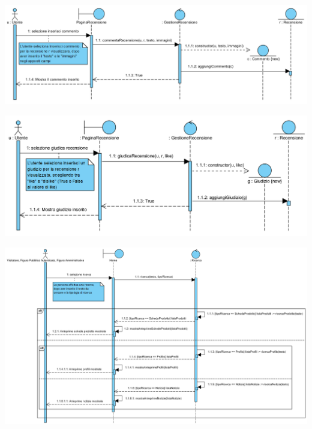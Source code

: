 \begin{landscape}
\begin{center}
			\includegraphics[width=\linewidth]{assets/visualParadigm/sequenza/commentoRecensione}
\end{center}
\end{landscape}

\begin{landscape}
\begin{center}
			\includegraphics[width=\linewidth]{assets/visualParadigm/sequenza/giudicaRecensione}
\end{center}
\end{landscape}

\begin{landscape}
\begin{center}
			\includegraphics[width=\linewidth]{assets/visualParadigm/sequenza/ricerca}
\end{center}
\end{landscape}


